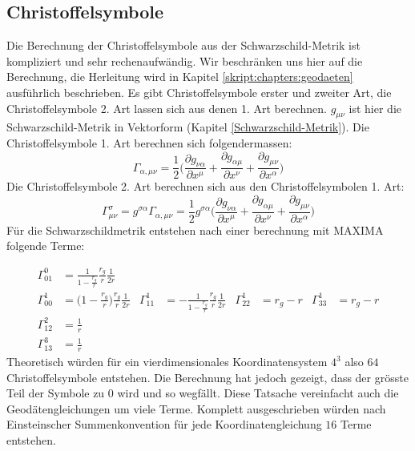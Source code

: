 \begin{refsection}
	\subsection{Christoffelsymbole}\label{christoffel}
	
	Die Berechnung der Christoffelsymbole aus der Schwarzschild-Metrik ist kompliziert und sehr rechenaufwändig. Wir beschränken uns hier auf die Berechnung, die Herleitung wird in Kapitel \ref{skript:chapters:geodaeten} ausführlich beschrieben. Es gibt Christoffelsymbole erster und zweiter Art, die Christoffelsymbole 2. Art lassen sich aus denen 1. Art berechnen.
	$g_{\mu\nu}$ ist hier die Schwarzschild-Metrik in Vektorform (Kapitel \ref{Schwarzschild-Metrik}).
	Die Christoffelsymbole 1. Art berechnen sich folgendermassen:
	\begin{equation}
		\Gamma_{\alpha,\mu\nu} 
		= 
		\frac{1}{2}\biggl(\frac{\partial g_{\nu\alpha}}{\partial x^{\mu}} 
		+
		\frac{\partial g_{\alpha\mu}}{\partial x^{\nu}}
		+
		\frac{\partial g_{\mu\nu}}{\partial x^{\alpha}}
		 \biggr)
	\end{equation}
	Die Christoffelsymbole 2. Art berechnen sich aus den Christoffelsymbolen 1. Art:
	\begin{equation}
	\Gamma^{\sigma}_{\mu\nu} 
	= 
	g^{\sigma\alpha}\Gamma_{\alpha,\mu\nu} 
	=
	\frac{1}{2}g^{\sigma\alpha}\biggl(\frac{\partial g_{\nu\alpha}}{\partial x^{\mu}} 
	+
	\frac{\partial g_{\alpha\mu}}{\partial x^{\nu}}
	+
	\frac{\partial g_{\mu\nu}}{\partial x^{\alpha}}
	\biggr)
	\end{equation}
	Für die Schwarzschildmetrik entstehen nach einer berechnung mit MAXIMA folgende Terme:
	
	\begin{align*}
	\Gamma^0_{01}
	&=
	\frac{1}{1-\displaystyle\frac{r_g}{r}}
	\frac{r_g}{r}
	\frac{1}{2r}
	\\
	\Gamma^1_{00}
	&=
	\biggl(1-\displaystyle\frac{r_g}{r}\biggr)
	\frac{r_g}{r}
	\frac{1}{2r}
	&
	\Gamma^1_{11}
	&=
	-\frac1{1-\displaystyle\frac{r_g}{r}}
	\frac{r_g}{r}
	\frac{1}{2r}
	&
	\Gamma^1_{22}
	&=
	r_g-r
	&
	\Gamma^1_{33}
	&=
	r_g-r
	\\
	\Gamma^2_{12}
	&=
	\frac1r
	\\
	\Gamma^3_{13}
	&=
	\frac1r
	\end{align*}
	Theoretisch würden für ein vierdimensionales Koordinatensystem $4^{3}$ also $64$ Christoffelsymbole entstehen. Die Berechnung hat jedoch gezeigt, dass der grösste Teil der Symbole zu $0$ wird und so wegfällt. Diese Tatsache vereinfacht auch die Geodätengleichungen um viele Terme. Komplett ausgeschrieben würden nach Einsteinscher Summenkonvention für jede Koordinatengleichung $16$ Terme entstehen.
	

\end{refsection}
